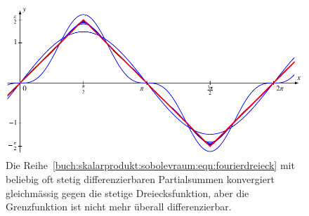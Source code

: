 \begin{figure}
\centering
\includegraphics{chapters/010-skalarprodukt/images/fourierdreieck.pdf}
\caption{Die 
Reihe~\ref{buch:skalarprodukt:sobolevraum:eqn:fourierdreieck}
mit beliebig oft stetig differenzierbaren Partialsummen konvergiert
gleichmässig gegen die stetige Dreiecksfunktion, aber die Grenzfunktion
ist nicht mehr überall differenzierbar.
\label{buch:skalarprodukt:sobolevraum:fig:fourierdreieck}}
\end{figure}
